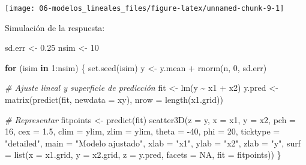 \documentclass[
  spanish,
]{book}
\newenvironment{Shaded}{\begin{snugshade}}{\end{snugshade}}
\newcommand{\AttributeTok}[1]{\textcolor[rgb]{0.77,0.63,0.00}{#1}}
\newcommand{\CommentTok}[1]{\textcolor[rgb]{0.56,0.35,0.01}{\textit{#1}}}
\newcommand{\ConstantTok}[1]{\textcolor[rgb]{0.00,0.00,0.00}{#1}}
\newcommand{\ControlFlowTok}[1]{\textcolor[rgb]{0.13,0.29,0.53}{\textbf{#1}}}
\newcommand{\DecValTok}[1]{\textcolor[rgb]{0.00,0.00,0.81}{#1}}
\newcommand{\FloatTok}[1]{\textcolor[rgb]{0.00,0.00,0.81}{#1}}
\newcommand{\FunctionTok}[1]{\textcolor[rgb]{0.00,0.00,0.00}{#1}}
\newcommand{\NormalTok}[1]{#1}
\newcommand{\OtherTok}[1]{\textcolor[rgb]{0.56,0.35,0.01}{#1}}
\newcommand{\SpecialCharTok}[1]{\textcolor[rgb]{0.00,0.00,0.00}{#1}}
\newcommand{\StringTok}[1]{\textcolor[rgb]{0.31,0.60,0.02}{#1}}
\theoremstyle{break}
\theoremstyle{definition}
\theoremstyle{definition}
\theoremstyle{definition}
\theoremstyle{definition}
\theoremstyle{remark}
\begin{document}
\begin{center}\texttt{[image: 06-modelos\_lineales\_files/figure-latex/unnamed-chunk-9-1]} \end{center}

Simulación de la respuesta:

\begin{Shaded}
\begin{Highlighting}[]
\NormalTok{sd.err }\OtherTok{\textless{}{-}} \FloatTok{0.25}
\NormalTok{nsim }\OtherTok{\textless{}{-}} \DecValTok{10}

\ControlFlowTok{for}\NormalTok{ (isim }\ControlFlowTok{in} \DecValTok{1}\SpecialCharTok{:}\NormalTok{nsim) \{}
  \FunctionTok{set.seed}\NormalTok{(isim)}
\NormalTok{  y }\OtherTok{\textless{}{-}}\NormalTok{ y.mean }\SpecialCharTok{+} \FunctionTok{rnorm}\NormalTok{(n, }\DecValTok{0}\NormalTok{, sd.err)}
  
  \CommentTok{\# Ajuste lineal y superficie de predicción}
\NormalTok{  fit }\OtherTok{\textless{}{-}} \FunctionTok{lm}\NormalTok{(y }\SpecialCharTok{\textasciitilde{}}\NormalTok{ x1 }\SpecialCharTok{+}\NormalTok{ x2)}
\NormalTok{  y.pred }\OtherTok{\textless{}{-}} \FunctionTok{matrix}\NormalTok{(}\FunctionTok{predict}\NormalTok{(fit, }\AttributeTok{newdata =}\NormalTok{ xy), }\AttributeTok{nrow =} \FunctionTok{length}\NormalTok{(x1.grid)) }
  
  \CommentTok{\# Representar}
\NormalTok{  fitpoints }\OtherTok{\textless{}{-}} \FunctionTok{predict}\NormalTok{(fit) }
  \FunctionTok{scatter3D}\NormalTok{(}\AttributeTok{z =}\NormalTok{ y, }\AttributeTok{x =}\NormalTok{ x1, }\AttributeTok{y =}\NormalTok{ x2, }\AttributeTok{pch =} \DecValTok{16}\NormalTok{, }\AttributeTok{cex =} \FloatTok{1.5}\NormalTok{, }\AttributeTok{clim =}\NormalTok{ ylim, }\AttributeTok{zlim =}\NormalTok{ ylim,}
            \AttributeTok{theta =} \SpecialCharTok{{-}}\DecValTok{40}\NormalTok{, }\AttributeTok{phi =} \DecValTok{20}\NormalTok{, }\AttributeTok{ticktype =} \StringTok{"detailed"}\NormalTok{, }
            \AttributeTok{main =} \StringTok{"Modelo ajustado"}\NormalTok{, }\AttributeTok{xlab =} \StringTok{"x1"}\NormalTok{, }\AttributeTok{ylab =} \StringTok{"x2"}\NormalTok{, }\AttributeTok{zlab =} \StringTok{"y"}\NormalTok{, }
            \AttributeTok{surf =} \FunctionTok{list}\NormalTok{(}\AttributeTok{x =}\NormalTok{ x1.grid, }\AttributeTok{y =}\NormalTok{ x2.grid, }\AttributeTok{z =}\NormalTok{ y.pred, }
                        \AttributeTok{facets =} \ConstantTok{NA}\NormalTok{, }\AttributeTok{fit =}\NormalTok{ fitpoints))}
\NormalTok{\}}
\end{Highlighting}
\end{Shaded}
\end{document}
